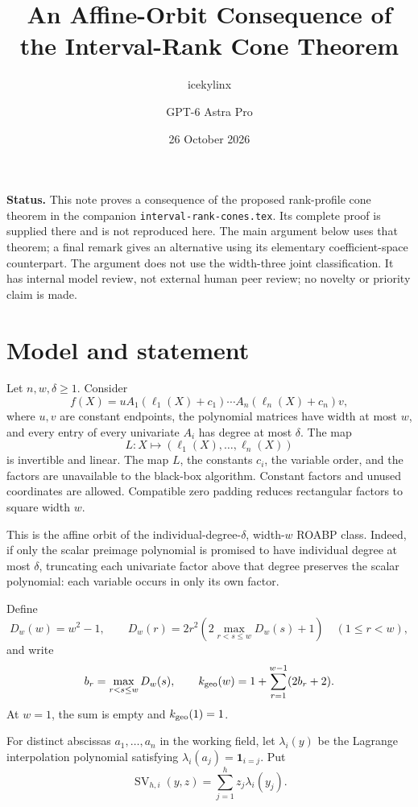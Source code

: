 \documentclass[11pt]{article}
\title{An Affine-Orbit Consequence of the Interval-Rank Cone Theorem}
\author{icekylinx \and GPT-6 Astra Pro}
\date{26 October 2026}
\newcommand{\SV}{\operatorname{SV}}
\begin{document}
\maketitle

\noindent\textbf{Status.}
This note proves a consequence of the proposed rank-profile cone theorem
in the companion \texttt{interval-rank-cones.tex}. Its complete proof
is supplied there and is not reproduced here. The main argument
below uses that theorem; a final remark gives an alternative using its
elementary coefficient-space counterpart. The argument does not use the
width-three joint classification. It has internal model review, not
external human peer review; no novelty or priority claim is made.

\section{Model and statement}

Let $n,w,\delta\ge1$. Consider
\[
 f(X)=uA_1(\ell_1(X)+c_1)\cdots
       A_n(\ell_n(X)+c_n)v,
\]
where $u,v$ are constant endpoints, the polynomial matrices have width
at most $w$, and every entry of every univariate $A_i$ has degree at most
$\delta$. The map
\[
 L:X\longmapsto(\ell_1(X),\ldots,\ell_n(X))
\]
is invertible and linear. The map $L$, the constants $c_i$, the variable
order, and the factors are unavailable to the black-box algorithm.
Constant factors and unused coordinates are allowed. Compatible zero
padding reduces rectangular factors to square width $w$.

This is the affine orbit of the individual-degree-$\delta$, width-$w$
ROABP class. Indeed, if only the scalar preimage polynomial is promised
to have individual degree at most $\delta$, truncating each univariate
factor above that degree preserves the scalar polynomial: each variable
occurs in only its own factor.

Define
\[
 D_w(w)=w^2-1,\qquad
 D_w(r)=2r^2\left(2\max_{r<s\le w}D_w(s)+1\right)
 \quad(1\le r<w),
\]
and write
\[
 b_r=\max_{r<s\le w}D_w(s),\qquad
 k_{\rm geo}(w)=1+\sum_{r=1}^{w-1}(2b_r+2).
\]
At $w=1$, the sum is empty and $k_{\rm geo}(1)=1$.

For distinct abscissas $a_1,\ldots,a_n$ in the working field, let
$\lambda_i(y)$ be the Lagrange interpolation polynomial satisfying
$\lambda_i(a_j)=\mathbf 1_{i=j}$. Put
\[
 \SV_{h,i}(y,z)=\sum_{j=1}^h z_j\lambda_i(y_j).
\]
\end{document}
